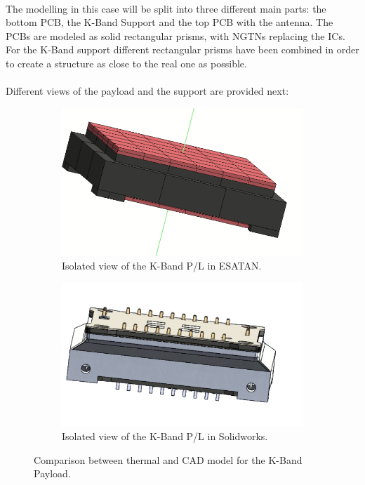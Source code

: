 \paragraph{}

The modelling in this case will be split into three different main parts: the bottom PCB, the K-Band Support
and the top PCB with the antenna. The PCBs are modeled as solid rectangular prisms, with NGTNs replacing
the ICs. For the K-Band support different rectangular prisms have been combined in order to create a structure as
close to the real one as possible.

\paragraph{}

Different views of the payload and the support are provided next:

\begin{figure}[H]
  \centering
  \begin{subfigure}{.5\textwidth}
    \centering
    \includegraphics[width=.6\linewidth]{res/img/5_simulationanalisys/Comparisons/ESATAN/kband.PNG}
    \caption{Isolated view of the K-Band P/L in ESATAN.}
    \label{fig:kbandfull}
  \end{subfigure}%
  \begin{subfigure}{.5\textwidth}
    \centering
    \includegraphics[width=.5\linewidth]{res/img/5_simulationanalisys/Comparisons/SLDW/kband_Solid.PNG}
    \caption{Isolated view of the K-Band P/L in Solidworks.}
    \label{fig:kbandfullsolid}
  \end{subfigure}
  \caption{Comparison between thermal and CAD model for the K-Band Payload.}
  \label{fig:kbandfullim}
\end{figure}

